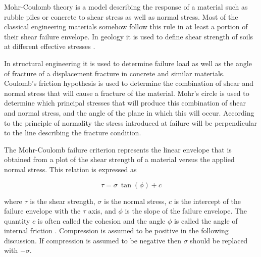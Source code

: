 Mohr-Coulomb theory is a model describing the response of a material such as rubble piles or concrete to shear stress as well as normal stress. 
Most of the classical engineering materials somehow follow this rule in at least a portion of their shear failure envelope. In geology it is used to define shear strength of soils at different effective stresses \cite{hand69}.

In structural engineering it is used to determine failure load as well as the angle of fracture of a displacement fracture in concrete and similar materials. Coulomb's friction hypothesis is used to determine the combination of shear and normal stress that will cause a fracture of the material. Mohr's circle is used to determine which principal stresses that will produce this combination of shear and normal stress, and the angle of the plane in which this will occur. According to the principle of normality the stress introduced at failure will be perpendicular to the line describing the fracture condition.


The Mohr-Coulomb failure criterion represents the linear envelope that is obtained from a plot of the shear strength of a material 
versus the applied normal stress. This relation is expressed as

\[
\tau = \sigma~\tan(\phi) + c 
\]

where $\tau$ is the shear strength, $\sigma$ is the normal stress, $c$ is the intercept of the failure envelope with the $\tau$ axis, and $\phi$ is the slope of the failure envelope. The quantity $c$ is often called the cohesion and the angle $\phi$ is called the angle of internal friction . Compression is assumed to be positive in the following discussion. If compression is assumed to be negative then $\sigma$ should be replaced with $-\sigma$.


